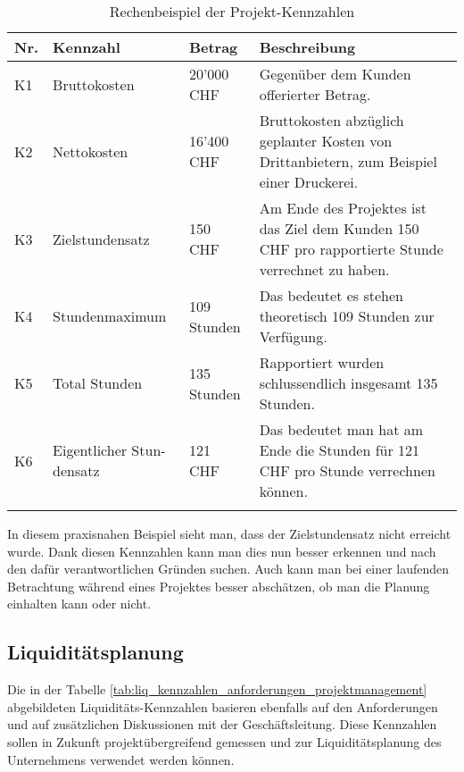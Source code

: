 \begin{longtable}{lp{3cm}p{3cm}p{7cm}}
    \toprule \textbf{Nr.} & \textbf{Kennzahl} & \textbf{Betrag} & \textbf{Beschreibung} \\
    \midrule K1 & Bruttokosten & 20'000 CHF & 
        Gegenüber dem Kunden offerierter Betrag. \\
    \midrule K2 & Nettokosten & 16'400 CHF &
        Bruttokosten abzüglich geplanter Kosten von Drittanbietern, zum
        Beispiel einer Druckerei.\\
    \midrule K3 & Zielstundensatz & 150 CHF & 
        Am Ende des Projektes ist das Ziel dem Kunden 150 CHF pro rapportierte
        Stunde verrechnet zu haben. \\
    \midrule K4 & Stundenmaximum & 109 Stunden & 
        Das bedeutet es stehen theoretisch 109 Stunden zur Verfügung. \\
    \midrule K5 & Total Stunden & 135 Stunden & 
        Rapportiert wurden schlussendlich insgesamt 135 Stunden. \\
    \midrule K6 & Eigentlicher Stun- densatz & 121 CHF & 
        Das bedeutet man hat am Ende die Stunden für 121 CHF pro Stunde
        verrechnen können. \\
    \bottomrule
    \caption[Rechenbeispiel der Projekt-Kennzahlen]{Rechenbeispiel der 
        Projekt-Kennzahlen\footnotemark}
    \label{tab:proj_kennzahlen_anforderungen_projektmanagement_bsp}
\end{longtable}

In diesem praxisnahen Beispiel sieht man, dass der Zielstundensatz nicht erreicht
wurde. Dank diesen Kennzahlen kann man dies nun besser erkennen und nach den 
dafür verantwortlichen Gründen suchen. Auch kann man bei einer laufenden 
Betrachtung während eines Projektes besser abschätzen, ob man die Planung
einhalten kann oder nicht.

\subsection{Liquiditätsplanung}
Die in der Tabelle \ref{tab:liq_kennzahlen_anforderungen_projektmanagement} abgebildeten
Liquiditäts-Kennzahlen basieren ebenfalls auf den Anforderungen und auf zusätzlichen
Diskussionen mit der Geschäftsleitung. Diese Kennzahlen sollen in Zukunft
projektübergreifend gemessen und zur Liquiditätsplanung des Unternehmens
verwendet werden können.

